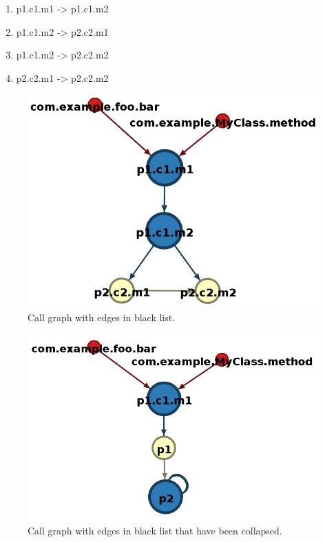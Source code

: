 \documentclass{sig-alternate}
\begin{document}
\begin{enumerate}
\item p1.c1.m1 -> p1.c1.m2
\item p1.c1.m2 -> p2.c2.m1
\item p1.c1.m2 -> p2.c2.m2
\item p2.c2.m1 -> p2.c2.m2
\end{enumerate}

\begin{figure}
  \centering
  \includegraphics[scale=0.30]{figs/callgraph_sample_full.png}
  \caption{Call graph with edges in black list.}
  \label{fig:callgraph_sample_full}
\end{figure}

\begin{figure}
  \centering
  \includegraphics[scale=0.30]{figs/callgraph_sample_collapsed.png}
  \caption{Call graph with edges in black list that have been collapsed.}
  \label{fig:callgraph_sample_collapsed}
\end{figure}
\end{document}
